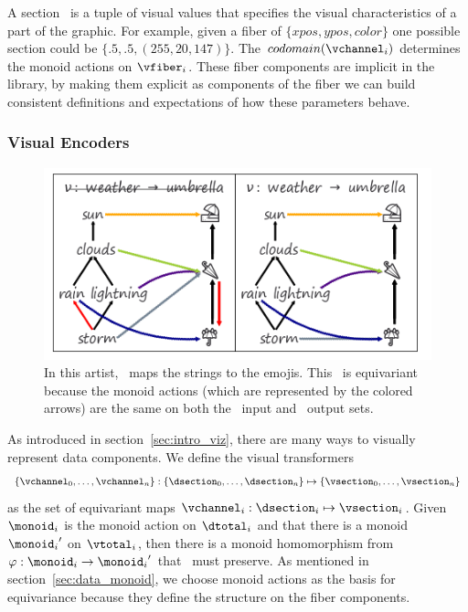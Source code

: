 \documentclass[../main.tex]{subfiles}
\begin{document}
 A section \vsection\ is a tuple of visual values that specifies the visual characteristics of a part of the graphic. For example, given a fiber of $\{xpos, ypos, color\}$ one possible section could be  $\{.5, .5, (255, 20,147)\}$. The $codomain(\vchannel_i)$ determines the monoid actions on $\vfiber_i$. These fiber components are implicit in the library, by making them explicit as components of the fiber we can build consistent definitions and expectations of how these parameters behave. 

 
\subsubsection{Visual Encoders \vchannel}
\label{sec:artist_nu}
\begin{figure}[H]
    \includegraphics[width=\textwidth]{figures/math/partial_fixed.png}
    \caption{In this artist, \vchannel\ maps the strings to the emojis. This \vchannel\ is equivariant because the monoid actions (which are represented by the colored arrows) are the same on both the \dsection\ input and \vsection\ output sets.}
    \label{fig:artist_nu}
\end{figure}
As introduced in section~\ref{sec:intro_viz}, there are many ways to visually represent data components. We define the visual transformers \vchannel\ 
\begin{equation}
    \label{eq:nu_expanded}
    \{\vchannel_{0}, \ldots, \vchannel_{n}\}: \{\dsection_{0}, \ldots, \dsection_{n}\} \mapsto \{\vsection_{0}, \ldots, \vsection_{n}\}
\end{equation}
as the set of equivariant maps $\vchannel_i: \dsection_i \mapsto \vsection_i$. Given $\monoid_i$ is the monoid action on $\dtotal_i$ and that there is a monoid ${\monoid_i}^{\prime}$ on $\vtotal_i$, then there is a monoid homomorphism from $\varphi:\monoid_i \rightarrow {\monoid_i}^{\prime}$ that \vchannel\ must preserve. As mentioned in section~\ref{sec:data_monoid}, we choose monoid actions as the basis for equivariance because they define the structure on the fiber components.  
\end{document}
